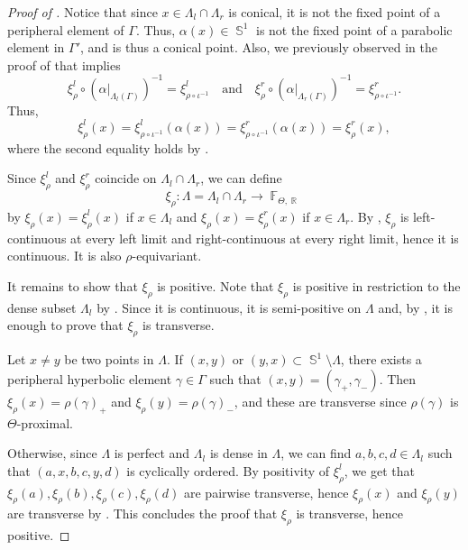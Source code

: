 \documentclass{amsart}
\theoremstyle{plain}
\theoremstyle{definition}
\DeclareMathOperator{\Fb}{{\mathbb{F}}}
\DeclareMathOperator{\Rb}{{\mathbb{R}}}
\DeclareMathOperator{\Sb}{\mathbb{S}}
\newcommand{\1}{\mathbf{1}}
\begin{document}
\begin{proof}[Proof of ]
    Notice that since $x\in\Lambda_l\cap\Lambda_r$ is conical, it is not the fixed point of a peripheral element of $\Gamma$. Thus, $\alpha(x)\in\Sb^1$ is not the fixed point of a parabolic element in $\Gamma'$, and is thus a conical point. Also, we previously observed in the proof of  that  implies 
\[\xi_\rho^l\circ(\alpha|_{\Lambda_l(\Gamma)})^{-1}=\xi_{\rho\circ\iota^{-1}}^l\quad\text{and}\quad\xi_\rho^r\circ(\alpha|_{\Lambda_r(\Gamma)})^{-1}=\xi_{\rho\circ\iota^{-1}}^r.\]
Thus,
\[\xi^l_\rho(x)=\xi_{\rho\circ\iota^{-1}}^l(\alpha(x))=\xi_{\rho\circ\iota^{-1}}^r(\alpha(x))=\xi_\rho^r(x),\]
where the second equality holds by .

Since $\xi_\rho^l$ and $\xi_\rho^r$ coincide on $\Lambda_l \cap \Lambda_r$, we can define
\[\xi_\rho: \Lambda = \Lambda_l \cap \Lambda_r \to \Fb_{\Theta,\Rb}\]
by $\xi_\rho(x) = \xi_\rho^l(x)$ if $x\in \Lambda_l$ and $\xi_\rho(x) = \xi_\rho^r(x)$ if $x\in \Lambda_r$. By , $\xi_\rho$ is left-continuous at every left limit and right-continuous at every right limit, hence it is continuous. It is also $\rho$-equivariant. 

It remains to show that $\xi_\rho$ is positive.
Note that $\xi_\rho$ is positive in restriction to the dense subset $\Lambda_l$ by . Since it is continuous, it is semi-positive on $\Lambda$ and, by , it is enough to prove that $\xi_\rho$ is transverse. 

Let $x\neq y$ be two points in $\Lambda$. If $(x,y)$ or $(y,x) \subset \Sb^1\setminus \Lambda$, there exists a peripheral hyperbolic element $\gamma\in \Gamma$ such that $(x,y) = (\gamma_+,\gamma_-)$. Then $\xi_\rho(x) = \rho(\gamma)_+$ and $\xi_\rho(y) = \rho(\gamma)_-$, and these are transverse since $\rho(\gamma)$ is $\Theta$-proximal.

Otherwise, since $\Lambda$ is perfect and $\Lambda_l$ is dense in $\Lambda$, we can find $a,b,c,d\in \Lambda_l$ such that $(a,x,b,c,y,d)$ is cyclically ordered. By positivity of $\xi_\rho^l$, we get that $\xi_\rho(a), \xi_\rho(b),\xi_\rho(c),\xi_\rho(d)$ are pairwise transverse, hence $\xi_\rho(x)$ and $\xi_\rho(y)$ are transverse by . This concludes the proof that $\xi_\rho$ is transverse, hence positive. 
\end{proof}
\end{document}
